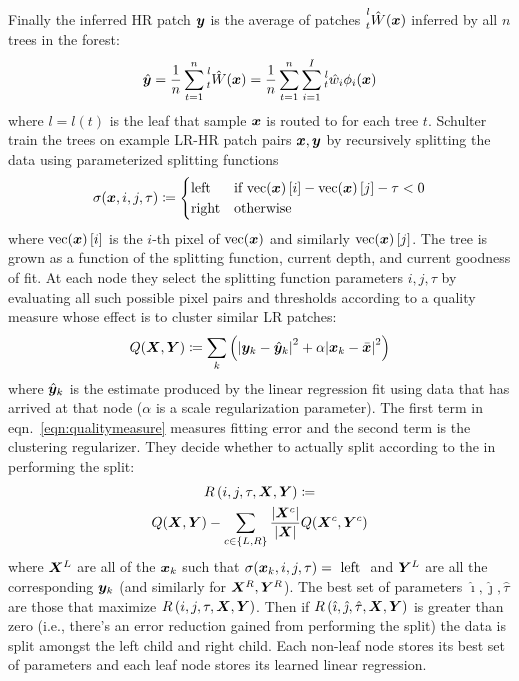%
Finally the inferred HR patch \(\bm{y}\) is the average of patches \(\prescript{l}{t}{\hat{W}(\bm{x})}\) inferred by all \(n\) trees in the forest:
\begin{equation}
    \hat{\bm{y}} = \frac{1}{n} \sum_{t=1}^{n} \prescript{l}{t}{\hat{W}(\bm{x})} =  \frac{1}{n} \sum_{t=1}^{n} \sum_{i=1}^I \prescript{l}{t}{\hat{w}_i}\phi_i(\bm{x})
\end{equation}
where \(l = l(t)\) is the leaf that sample \(\bm{x}\) is routed to for each tree \(t\).
%
Schulter \etal train the trees on example LR-HR patch pairs \(\bm{x}, \bm{y}\) by recursively splitting the data using parameterized splitting functions
\begin{equation}
    \sigma(\bm{x}, i, j, \tau)\coloneqq {
        \begin{cases}
            \text{left}  & \text{if } \text{vec}(\bm{x})\left[ i \right] - \text{vec}(\bm{x})\left[ j \right] - \tau < 0 \\
            \text{right} & \text{otherwise}
        \end{cases}
    }
\end{equation}
where \(\text{vec}(\bm{x})\left[ i \right]\) is the \(i\)-th pixel of \(\text{vec}(\bm{x})\) and similarly \(\text{vec}(\bm{x})\left[ j \right]\).
%
The tree is grown as a function of the splitting function, current depth, and current goodness of fit.
%
At each node they select the splitting function parameters \(i, j, \tau\) by evaluating all such possible pixel pairs and thresholds according to a quality measure whose effect is to cluster similar LR patches:
\begin{equation}
    Q(\bm{X}, \bm{Y}) \coloneqq \sum_k \left( \abs{ \bm{y}_k - \hat{\bm{y}}_k }^2 + \alpha\abs{ \bm{x}_k - \bar{\bm{x}} }^2 \right)
    \label{eqn:qualitymeasure}
\end{equation}
where \(\hat{\bm{y}}_k\) is the estimate produced by the linear regression fit using data that has arrived at that node (\(\alpha\) is a scale regularization parameter).
%
The first term in eqn.~\eqref{eqn:qualitymeasure} measures fitting error and the second term is the clustering regularizer.
%
They decide whether to actually split according to the  in performing the split:
\begin{multline*}
    R\left(i, j, \tau, \bm{X}, \bm{Y} \right) \coloneqq \\ Q(\bm{X}, \bm{Y}) - \sum_{c\in\left\{L, R\right\}} \frac{\abs{\bm{X}^c}}{\abs{\bm{X}}} Q(\bm{X}^c, \bm{Y}^c)
\end{multline*}
where \(\bm{X}^L\) are all of the \(\bm{x}_k\) such that \(\sigma(\bm{x}_k, i, j, \tau) = \text{ left }\) and \(\bm{Y}^L\) are all the corresponding \(\bm{y}_k\) (and similarly for \(\bm{X}^R, \bm{Y}^R\)).
%
The best set of parameters \(\hat{\imath}, \hat{\jmath}, \hat{\tau}\) are those that maximize \(R\left(i, j, \tau, \bm{X}, \bm{Y} \right)\).
%
Then if \(R\left(\hat{\imath}, \hat{\jmath}, \hat{\tau}, \bm{X}, \bm{Y} \right)\) is greater than zero (i.e., there's an error reduction gained from performing the split) the data is split amongst the left child and right child.
%
Each non-leaf node stores its best set of parameters and each leaf node stores its learned linear regression.

